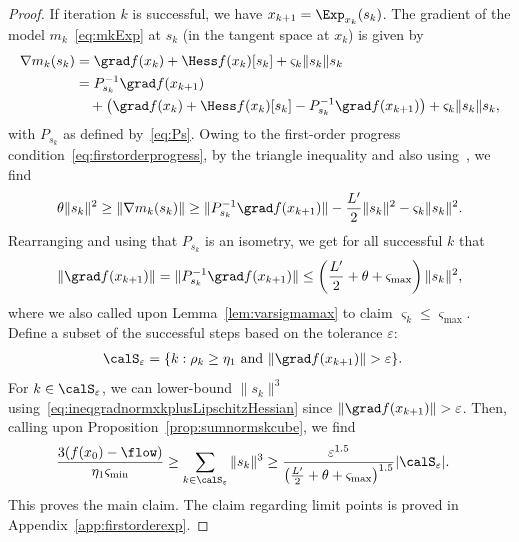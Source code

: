 \begin{proof}
	If iteration $k$ is successful, we have $x_{k+1} = \Exp_{x_k}(s_k)$.
	The gradient of the model $m_k$~\eqref{eq:mkExp} at $s_k$ (in the tangent space at $x_k$) is given by
	\begin{align*}
	\nabla m_k(s_k) & = \grad f(x_k) + \Hess f(x_k)[s_k] + \varsigma_k \|s_k\| s_k \\
	& = P_{s_k}^{-1}\grad f(x_{k+1}) \\ & \quad + \left( \grad f(x_k) + \Hess f(x_k)[s_k] - P_{s_k}^{-1}\grad f(x_{k+1}) \right) + \varsigma_k \|s_k\| s_k,
	\end{align*}
	with $P_{s_k}$ as defined by~\eqref{eq:Ps}. %
	Owing to the first-order progress condition~\eqref{eq:firstorderprogress}, by the triangle inequality and also using~, we find
	\begin{align*}
		\theta \|s_k\|^2 \geq \|\nabla m_k(s_k)\| \geq \|P_{s_k}^{-1}\grad f(x_{k+1})\| - \frac{L'}{2} \|s_k\|^2 - \varsigma_k \|s_k\|^2.
	\end{align*}
	Rearranging and using that $P_{s_k}$ is an isometry, we get for all successful $k$ that
	\begin{align}
		\|\grad f(x_{k+1})\| = \|P_{s_k}^{-1}\grad f(x_{k+1})\| \leq \left(\frac{L'}{2} + \theta + \varsigma_{\max}\right) \|s_k\|^2,
		\label{eq:ineqgradnormxkplusLipschitzHessian}
	\end{align}
	where we also called upon Lemma~\ref{lem:varsigmamax} to claim $\varsigma_k \leq \varsigma_{\max}$.
	Define a subset of the successful steps based on the tolerance $\varepsilon$:
	\begin{align*}
		\calS_\varepsilon & = \{ k : \rho_k \geq \eta_1 \textrm{ and } \|\grad f(x_{k+1})\| > \varepsilon \}.
	\end{align*}
	For $k \in \calS_\varepsilon$, we can lower-bound $\|s_k\|^3$ using~\eqref{eq:ineqgradnormxkplusLipschitzHessian} since $\|\grad f(x_{k+1})\| > \varepsilon$. Then, calling upon Proposition~\ref{prop:sumnormskcube}, we find
	\begin{align*}
		\frac{3(f(x_0) - \flow)}{\eta_1 \varsigma_{\min}} & \geq \sum_{k \in \calS_\varepsilon} \|s_k\|^3 \geq  \frac{\varepsilon^{1.5}}{\left(\frac{L'}{2} + \theta + \varsigma_{\max}\right)^{1.5}} |\calS_\varepsilon|.
	\end{align*}
	This proves the main claim. The claim regarding limit points is proved in Appendix~\ref{app:firstorderexp}.
\end{proof}
